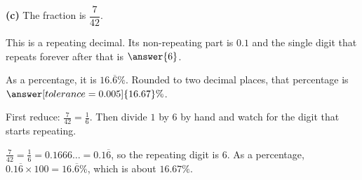 \documentclass[12pt]{ximera}
\begin{document}
\begin{problem}
\begin{prompt}
\textbf{(c)} The fraction is $\dfrac{7}{42}$.

This is a repeating decimal. Its non-repeating part is $0.1$ and the single digit
that repeats forever after that is $\answer{6}$.

As a percentage, it is $16.\overline{6}\%$. Rounded to two decimal places, that
percentage is $\answer[tolerance=0.005]{16.67}\%$.

\begin{hint}
First reduce: $\frac{7}{42}=\frac{1}{6}$. Then divide $1$ by $6$ by hand and watch
for the digit that starts repeating.
\end{hint}

\begin{feedback}
$\frac{7}{42}=\frac16 = 0.1666\ldots = 0.1\overline{6}$, so the repeating digit is
$6$. As a percentage, $0.1\overline{6}\times 100 = 16.\overline{6}\%$, which is
about $16.67\%$.
\end{feedback}
\end{prompt}
\end{problem}
\end{document}
